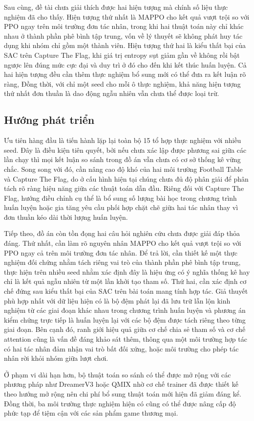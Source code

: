 \indent Sau cùng, đề tài chưa giải thích được hai hiện tượng mà chính số liệu thực nghiệm
đã cho thấy. Hiện tượng thứ nhất là MAPPO cho kết quả vượt trội so với PPO ngay trên môi
trường đơn tác nhân, trong khi hai thuật toán này chỉ khác nhau ở thành phần phê bình tập
trung, vốn về lý thuyết sẽ không phát huy tác dụng khi nhóm chỉ gồm một thành viên. Hiện
tượng thứ hai là kiểu thất bại của SAC trên Capture The Flag, khi giá trị entropy sụt giảm
gần về không rồi bật ngược lên đúng mức cực đại và duy trì ở đó cho đến khi kết thúc huấn
luyện. Cả hai hiện tượng đều cần thêm thực nghiệm bổ sung mới có thể đưa ra kết luận rõ
ràng, Đồng thời, với chỉ một seed cho mỗi ô thực nghiệm, khả năng hiện tượng thứ nhất
đơn thuần là dao động ngẫu nhiên vẫn chưa thể được loại trừ.

\subsection{Hướng phát triển}
\indent Ưu tiên hàng đầu là tiến hành lặp lại toàn bộ 15 tổ hợp thực nghiệm với nhiều seed. Đây là điều kiện tiên quyết, bởi nếu chưa xác lập được phương sai giữa
các lần chạy thì mọi kết luận so sánh trong đồ án vẫn chưa có cơ sở thống kê vững chắc.
Song song với đó, cần nâng cao độ khó của hai môi trường Football Table và Capture The
Flag, do ở cấu hình hiện tại chúng chưa đủ độ phân giải để phân tách rõ ràng hiệu năng
giữa các thuật toán dẫn đầu. Riêng đối với Capture The Flag, hướng điều chỉnh cụ thể là
bổ sung số lượng bài học trong chương trình huấn luyện hoặc gia tăng yêu cầu phối hợp
chặt chẽ giữa hai tác nhân thay vì đơn thuần kéo dài thời lượng huấn luyện.

\indent Tiếp theo, đồ án còn tồn đọng hai câu hỏi nghiên cứu chưa được giải đáp thỏa đáng.
Thứ nhất, cần làm rõ nguyên nhân MAPPO cho kết quả vượt trội so với PPO ngay cả trên môi
trường đơn tác nhân. Để trả lời, cần thiết kế một thực nghiệm đối chứng nhằm tách riêng
vai trò của thành phần phê bình tập trung, thực hiện trên nhiều seed nhằm xác định
đây là hiệu ứng có ý nghĩa thống kê hay chỉ là kết quả ngẫu nhiên từ một lần khởi tạo
tham số. Thứ hai, cần xác định cơ chế đứng sau kiểu thất bại của SAC trên bài toán mang
tính hợp tác. Giả thuyết phù hợp nhất với dữ liệu hiện có là bộ đệm phát lại đã lưu trữ
lẫn lộn kinh nghiệm từ các giai đoạn khác nhau trong chương trình huấn luyện và phương
án kiểm chứng trực tiếp là huấn luyện lại với các bộ đệm được tách riêng theo từng giai
đoạn. Bên cạnh đó, ranh giới hiệu quả giữa cơ chế chia sẻ tham số và cơ chế attention
cũng là vấn đề đáng khảo sát thêm, thông qua một môi trường hợp tác có hai tác nhân đảm
nhận vai trò bất đối xứng, hoặc môi trường cho phép tác nhân rời khỏi nhóm giữa lượt chơi.

\indent Ở phạm vi dài hạn hơn, bộ thuật toán so sánh có thể được mở rộng với các phương
pháp như DreamerV3 hoặc QMIX nhờ cơ chế trainer đã được thiết kế theo hướng mở rộng nên
chi phí bổ sung thuật toán mới hiện đã giảm đáng kể. Đồng thời, ba môi trường thực nghiệm
hiện có cũng có thể được nâng cấp độ phức tạp để tiệm cận với các sản phẩm game thương
mại. 
